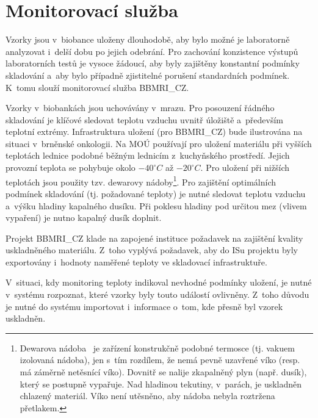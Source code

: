 \documentclass[11pt, draft, oneside]{fithesis2}
\newcommand{\ProjectName}{\mbox{BBMRI\_CZ}\xspace}
\begin{document}
\section{Monitorovací služba}\label{chapter:analysis:section:monitoring}
Vzorky jsou v~biobance uloženy dlouhodobě, aby bylo možné je laboratorně analyzovat i~delší dobu po jejich odebrání. Pro zachování konzistence výstupů laboratorních testů je vysoce žádoucí, aby byly zajištěny konstantní podmínky skladování a~aby bylo případně zjistitelné porušení standardních podmínek. K~tomu slouží monitorovací služba \ProjectName.

Vzorky v~biobankách jsou uchovávány v~mrazu. Pro posouzení řádného skladování je klíčové sledovat teplotu vzduchu uvnitř úložiště a~především teplotní extrémy. Infrastruktura uložení (pro \ProjectName) bude ilustrována na situaci v~brněnské onkologii. Na MOÚ používají pro uložení materiálu při vyšších teplotách lednice podobné běžným lednicím z~kuchyňského prostředí. Jejich provozní teplota se pohybuje okolo $-40^{\circ}C$ až $-20^{\circ}C$. Pro uložení při nižších teplotách jsou použity tzv. dewarovy nádoby\footnote{Dewarova nádoba~\cite{dewar} je zařízení konstrukčně podobné termosce (tj. vakuem izolovaná nádoba), jen s~tím rozdílem, že nemá pevně uzavřené víko (resp. má záměrně netěsnící víko). Dovnitř se nalije zkapalněný plyn (např. dusík), který se postupně vypařuje. Nad hladinou tekutiny, v~parách, je uskladněn chlazený materiál. Víko není utěsněno, aby nádoba nebyla roztržena přetlakem.}. Pro zajištění optimálních podmínek skladování (tj. požadované teploty) je nutné sledovat teplotu vzduchu a~výšku hladiny kapalného dusíku. Při poklesu hladiny pod určitou mez (vlivem vypaření) je nutno kapalný dusík doplnit. 

Projekt \ProjectName klade na zapojené instituce požadavek na zajištění kvality uskladněného materiálu. Z~toho vyplývá požadavek, aby do ISu projektu byly exportovány i~hodnoty naměřené teploty ve skladovací infrastruktuře.

V~situaci, kdy monitoring teploty indikoval nevhodné podmínky uložení, je nutné v~systému rozpoznat, které vzorky byly touto událostí ovlivněny. Z~toho důvodu je nutné do systému importovat i~informace o~tom, kde přesně byl vzorek uskladněn.

\end{document}
